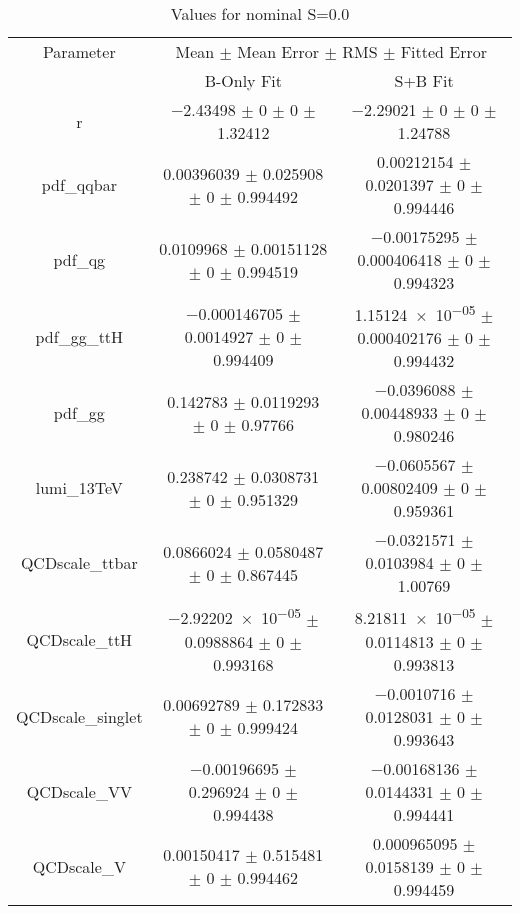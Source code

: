 \begin{table}
\centering
\caption{Values for nominal S=0.0}
\begin{tabular}{ccc}
\toprule
Parameter & \multicolumn{2}{c}{Mean $\pm$ Mean Error $\pm$ RMS $\pm$ Fitted Error}\\
 & B-Only Fit & S+B Fit\\
\midrule
r & \num{-2.43498} $\pm$ \num{0} $\pm$ \num{0} $\pm$ \num{1.32412} & \num{-2.29021} $\pm$ \num{0} $\pm$ \num{0} $\pm$ \num{1.24788}\\
pdf\_qqbar & \num{0.00396039} $\pm$ \num{0.025908} $\pm$ \num{0} $\pm$ \num{0.994492} & \num{0.00212154} $\pm$ \num{0.0201397} $\pm$ \num{0} $\pm$ \num{0.994446}\\
pdf\_qg & \num{0.0109968} $\pm$ \num{0.00151128} $\pm$ \num{0} $\pm$ \num{0.994519} & \num{-0.00175295} $\pm$ \num{0.000406418} $\pm$ \num{0} $\pm$ \num{0.994323}\\
pdf\_gg\_ttH & \num{-0.000146705} $\pm$ \num{0.0014927} $\pm$ \num{0} $\pm$ \num{0.994409} & \num{1.15124e-05} $\pm$ \num{0.000402176} $\pm$ \num{0} $\pm$ \num{0.994432}\\
pdf\_gg & \num{0.142783} $\pm$ \num{0.0119293} $\pm$ \num{0} $\pm$ \num{0.97766} & \num{-0.0396088} $\pm$ \num{0.00448933} $\pm$ \num{0} $\pm$ \num{0.980246}\\
lumi\_13TeV & \num{0.238742} $\pm$ \num{0.0308731} $\pm$ \num{0} $\pm$ \num{0.951329} & \num{-0.0605567} $\pm$ \num{0.00802409} $\pm$ \num{0} $\pm$ \num{0.959361}\\
QCDscale\_ttbar & \num{0.0866024} $\pm$ \num{0.0580487} $\pm$ \num{0} $\pm$ \num{0.867445} & \num{-0.0321571} $\pm$ \num{0.0103984} $\pm$ \num{0} $\pm$ \num{1.00769}\\
QCDscale\_ttH & \num{-2.92202e-05} $\pm$ \num{0.0988864} $\pm$ \num{0} $\pm$ \num{0.993168} & \num{8.21811e-05} $\pm$ \num{0.0114813} $\pm$ \num{0} $\pm$ \num{0.993813}\\
QCDscale\_singlet & \num{0.00692789} $\pm$ \num{0.172833} $\pm$ \num{0} $\pm$ \num{0.999424} & \num{-0.0010716} $\pm$ \num{0.0128031} $\pm$ \num{0} $\pm$ \num{0.993643}\\
QCDscale\_VV & \num{-0.00196695} $\pm$ \num{0.296924} $\pm$ \num{0} $\pm$ \num{0.994438} & \num{-0.00168136} $\pm$ \num{0.0144331} $\pm$ \num{0} $\pm$ \num{0.994441}\\
QCDscale\_V & \num{0.00150417} $\pm$ \num{0.515481} $\pm$ \num{0} $\pm$ \num{0.994462} & \num{0.000965095} $\pm$ \num{0.0158139} $\pm$ \num{0} $\pm$ \num{0.994459}\\

\end{tabular}
\end{table}

